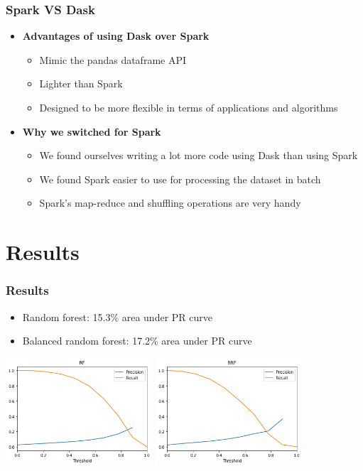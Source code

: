 \documentclass[slidestop,compress,red,mathserif]{beamer}
\begin{document}
\begin{frame}
	\frametitle{Spark VS Dask}
	\begin{itemize}
    \item[] \textbf{Advantages of using Dask over Spark}
      \begin{itemize}
      	\item Mimic the pandas dataframe API
        \item Lighter than Spark
      	\item Designed to be more flexible in terms of applications and algorithms
      \end{itemize}
    \item[] \textbf{Why we switched for Spark}
      \begin{itemize}
        \item We found ourselves writing a lot more code using Dask than using Spark
        \item We found Spark easier to use for processing the dataset in batch
        \item Spark's map-reduce and shuffling operations are very handy
      \end{itemize}
	\end{itemize}
\end{frame}

\section{Results}

\begin{frame}
	\frametitle{Results}
	\begin{itemize}
		\item Random forest: 15.3\% area under PR curve
		\item Balanced random forest: 17.2\% area under PR curve
	\end{itemize}
\centering
\includegraphics[height=4cm, keepaspectratio]{Figures/rf_results.png}
\includegraphics[height=4cm, keepaspectratio]{Figures/nohyperparam_brf.png}
\end{frame}
\end{document}
